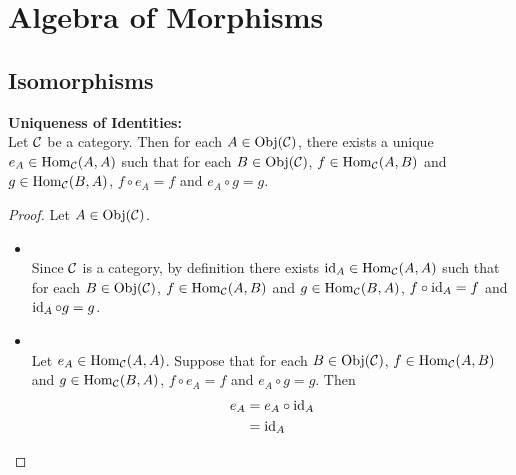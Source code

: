 \documentclass{book}
\begin{document}
	
	
	
	
	
	
	
	
	
	
	
	
	
	
	
	
	
	
	
	
	
	
	
	
	
	
	
	
	
	
	
	
	
	
	
	
	
	
	
	
	
	
	
	
	
	
	
	
	
	
	\newpage
	\section{Algebra of Morphisms}
	
	\subsection{Isomorphisms}
	
	\begin{ex}  \textbf{Uniqueness of Identities:} \\
		Let $\mathcal{C}$ be a category. Then for each $A \in \operatorname{Obj}(\mathcal{C})$, there exists a unique $e_A \in \operatorname{Hom}_{\mathcal{C}}(A, A)$ such that for each $B \in \operatorname{Obj}(\mathcal{C})$, $f \in \operatorname{Hom}_{\mathcal{C}}(A, B)$ and $g \in \operatorname{Hom}_{\mathcal{C}}(B, A)$, $f \circ e_A = f$ and $e_{A} \circ g = g$.
	\end{ex}
	
	\begin{proof}
		Let $A \in \operatorname{Obj}(\mathcal{C})$. 
		\begin{itemize}
			\item {} \\
			Since $\mathcal{C}$ is a category, by definition there exists $\operatorname{id}_A \in \operatorname{Hom}_{\mathcal{C}}(A, A)$ such that for each $B \in \operatorname{Obj}(\mathcal{C})$, $f \in \operatorname{Hom}_{\mathcal{C}}(A, B)$ and $g \in \operatorname{Hom}_{\mathcal{C}}(B, A)$, $f \circ \operatorname{id}_A = f$ and $\operatorname{id}_{A} \circ g = g$. 
			\item {} \\
			Let $e_A \in \operatorname{Hom}_{\mathcal{C}}(A, A)$. Suppose that for each $B \in \operatorname{Obj}(\mathcal{C})$, $f \in \operatorname{Hom}_{\mathcal{C}}(A, B)$ and $g \in \operatorname{Hom}_{\mathcal{C}}(B, A)$, $f \circ e_A = f$ and $e_{A} \circ g = g$. Then 
			\begin{align*}
				e_A
				& = e_A \circ \operatorname{id}_A \\
				& = \operatorname{id}_A 
			\end{align*}
		\end{itemize}
	\end{proof}
	
\end{document}
